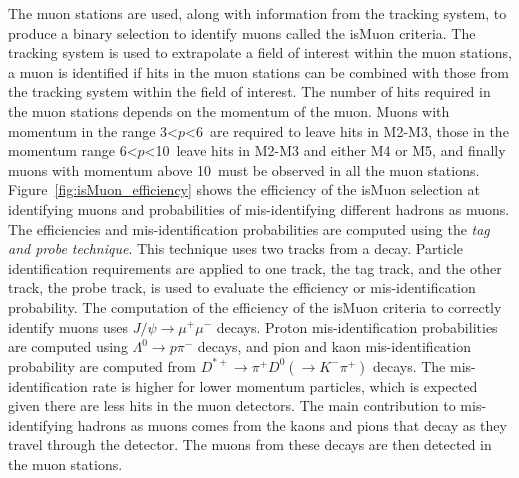 The muon stations are used, along with information from the tracking system, to produce a binary selection to identify muons called the isMuon criteria. The tracking system is used to extrapolate a field of interest within the muon stations, a muon is identified if hits in the muon stations can be combined with those from the tracking system within the field of interest. The number of hits required in the muon stations depends on the momentum of the muon. Muons with momentum in the range 3<$p$<6~\gevc are required to leave hits in M2-M3, those in the momentum range 6<$p$<10~\gevc leave hits in M2-M3 and either M4 or M5, and finally muons with momentum above 10~\gevc must be observed in all the muon stations. Figure~\ref{fig:isMuon_efficiency} shows the efficiency of the isMuon selection at identifying muons and probabilities of mis-identifying different hadrons as muons. The efficiencies and mis-identification probabilities are computed using the {\it tag and probe technique}. This technique uses two tracks from a decay. Particle identification requirements are applied to one track, the tag track, and the other track, the probe track, is used to evaluate the efficiency or mis-identification probability. The computation of the efficiency of the isMuon criteria to correctly identify muons uses $J/\psi \to \mu^+ \mu^-$ decays. Proton mis-identification probabilities are computed using $\Lambda^0 \to p \pi^-$ decays, and pion and kaon mis-identification probability are computed from $D^{*+} \to \pi^+ D^0 (\to K^- \pi^+)$ decays. The mis-identification rate is higher for lower momentum particles, which is expected given there are less hits in the muon detectors. The main contribution to mis-identifying hadrons as muons comes from the kaons and pions that decay as they travel through the detector. The muons from these decays are then detected in the muon stations.


